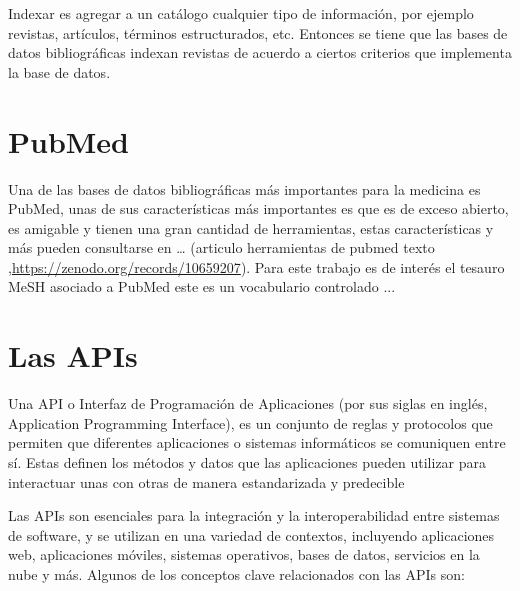 \smallskip
Indexar es  agregar a un catálogo cualquier tipo de información, por ejemplo revistas, artículos, términos estructurados, etc. Entonces se tiene que las bases de datos bibliográficas indexan revistas de acuerdo a ciertos criterios que implementa la base de datos. 
    
\section{PubMed}
\noindent
Una de las bases de datos bibliográficas más importantes para la medicina es PubMed, unas de sus características más importantes es que es de exceso abierto, es amigable y tienen una gran cantidad de herramientas, estas características y más pueden consultarse en … (articulo herramientas de pubmed texto ,\url{https://zenodo.org/records/10659207}). 
Para este trabajo es de interés el tesauro MeSH asociado a PubMed este es un vocabulario controlado ... 

\section{Las APIs}
\noindent
Una API o Interfaz de Programación de Aplicaciones (por sus siglas en inglés, Application Programming Interface), es un conjunto de reglas y protocolos que permiten que diferentes aplicaciones o sistemas informáticos se comuniquen entre sí.
Estas definen los métodos y datos que las aplicaciones pueden utilizar para interactuar unas con otras de manera estandarizada y predecible

\smallskip
Las APIs son esenciales para la integración y la interoperabilidad entre sistemas de software, y se utilizan en una variedad de contextos, incluyendo aplicaciones web, aplicaciones móviles, sistemas operativos, bases de datos, servicios en la nube y más. Algunos de los conceptos clave relacionados con las APIs son:  

